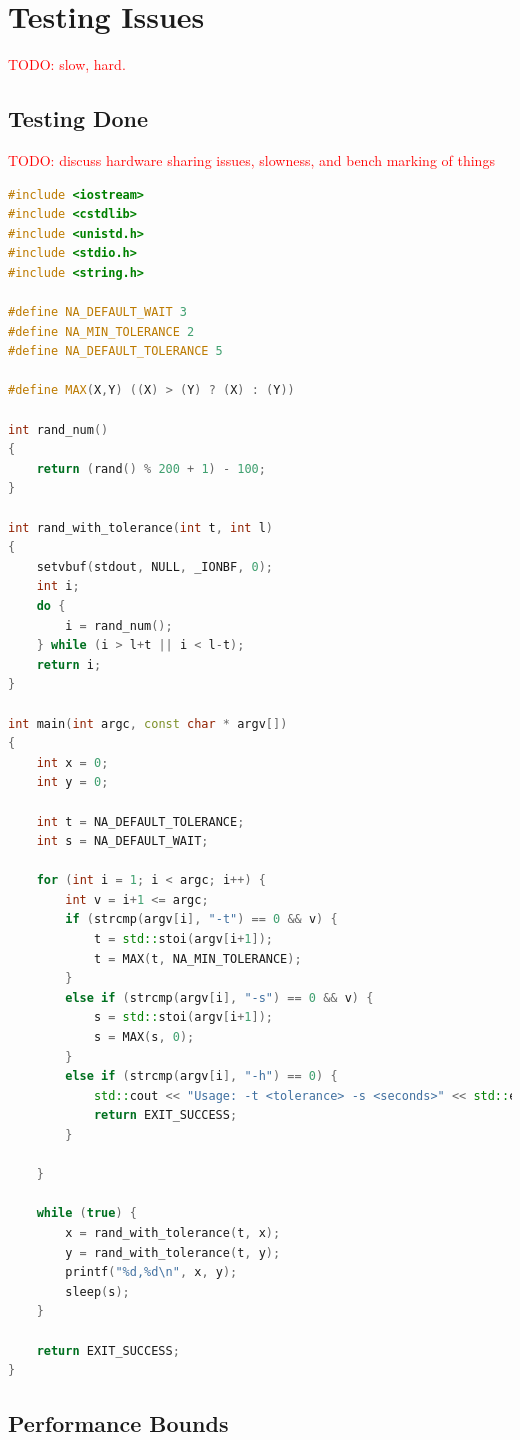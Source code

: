 \documentclass[11pt,a4paper,titlepage]{report}
\begin{document}
\section{Testing Issues}

\textcolor{red}{TODO: slow, hard.}


\subsection{Testing Done}

\textcolor{red}{TODO: discuss hardware sharing issues, slowness, and bench marking of things}

\begin{lstlisting}[caption=rand-face-detect.cpp,language=C++]
#include <iostream>
#include <cstdlib>
#include <unistd.h>
#include <stdio.h>
#include <string.h>

#define NA_DEFAULT_WAIT 3
#define NA_MIN_TOLERANCE 2
#define NA_DEFAULT_TOLERANCE 5

#define MAX(X,Y) ((X) > (Y) ? (X) : (Y))

int rand_num()
{
    return (rand() % 200 + 1) - 100;
}

int rand_with_tolerance(int t, int l)
{
    setvbuf(stdout, NULL, _IONBF, 0);
    int i;
    do {
        i = rand_num();
    } while (i > l+t || i < l-t);
    return i;
}

int main(int argc, const char * argv[])
{
    int x = 0;
    int y = 0;

    int t = NA_DEFAULT_TOLERANCE;
    int s = NA_DEFAULT_WAIT;

    for (int i = 1; i < argc; i++) {
        int v = i+1 <= argc;
        if (strcmp(argv[i], "-t") == 0 && v) {
            t = std::stoi(argv[i+1]);
            t = MAX(t, NA_MIN_TOLERANCE);
        }
        else if (strcmp(argv[i], "-s") == 0 && v) {
            s = std::stoi(argv[i+1]);
            s = MAX(s, 0);
        }
        else if (strcmp(argv[i], "-h") == 0) {
            std::cout << "Usage: -t <tolerance> -s <seconds>" << std::endl;
            return EXIT_SUCCESS;
        }

    }

    while (true) {
        x = rand_with_tolerance(t, x);
        y = rand_with_tolerance(t, y);
        printf("%d,%d\n", x, y);
        sleep(s);
    }

    return EXIT_SUCCESS;
}
\end{lstlisting}


\subsection{Performance Bounds}
\end{document}
